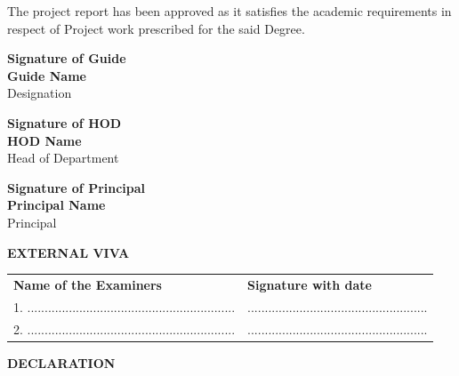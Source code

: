 \documentclass[12pt]{report}
\begin{document}
\vspace{0.3cm}
\noindent The project report has been approved as it satisfies the academic requirements in respect of Project work prescribed for the said Degree.

\vspace{1.2cm}
\noindent
\begin{minipage}{0.32\textwidth}
    \centering
    \textbf{Signature of Guide}\\
    \textbf{\lbrack Guide Name\rbrack}\\
    \lbrack Designation\rbrack
\end{minipage}
\hfill
\begin{minipage}{0.32\textwidth}
    \centering
    \textbf{Signature of HOD}\\
    \textbf{\lbrack HOD Name\rbrack}\\
    Head of Department
\end{minipage}
\hfill
\begin{minipage}{0.32\textwidth}
    \centering
    \textbf{Signature of Principal}\\
    \textbf{\lbrack Principal Name\rbrack}\\
    Principal
\end{minipage}

\vspace{1.2cm}
\begin{center}
    \textbf{\large EXTERNAL VIVA}
\end{center}
\vspace{0.2cm}
\noindent
\begin{tabularx}{\textwidth}{lX}
    \textbf{Name of the Examiners} & \textbf{Signature with date} \\[0.5cm]
    1. ............................................................ & .................................................... \\[0.5cm]
    2. ............................................................ & .................................................... \\
\end{tabularx}

\newpage
\thispagestyle{empty}
\begin{center}
    {\Large \textbf{DECLARATION}}\\[0.6cm]
\end{center}
\end{document}
